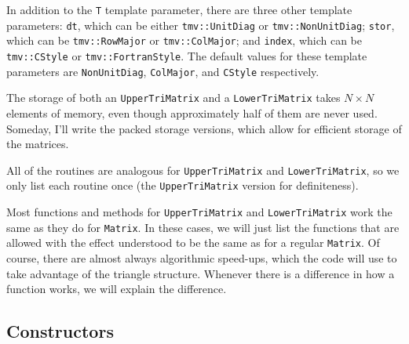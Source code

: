 \documentclass[twoside,letterpaper,11pt]{article}
\renewcommand{\tt}[1]{{\lstinline {#1}}}
\begin{document}
In addition to the \tt{T} template parameter, there are three other template 
parameters:
\tt{dt}, which can be either \tt{tmv::UnitDiag} or \tt{tmv::NonUnitDiag};
\tt{stor}, which can be \tt{tmv::RowMajor} or \tt{tmv::ColMajor};
and \tt{index}, which can be \tt{tmv::CStyle} or \tt{tmv::FortranStyle}.
The default values for these template parameters are 
\tt{NonUnitDiag}, \tt{ColMajor}, and \tt{CStyle} respectively.

The storage of both an \tt{UpperTriMatrix} and a \tt{LowerTriMatrix} takes
$N \times N$ elements of memory, even though approximately half of them 
are never used.  Someday, I'll write the packed storage versions, which allow for
efficient storage of the matrices.

All of the routines are analogous for \tt{UpperTriMatrix} and 
\tt{LowerTriMatrix}, so we only list each routine once 
(the \tt{UpperTriMatrix} version for
definiteness).  

Most functions and methods for \tt{UpperTriMatrix} and \tt{LowerTriMatrix}
work the same as they do for \tt{Matrix}.
In these cases, we will just list the functions that are allowed with the
effect understood to be the same as for a regular \tt{Matrix}.  Of course, there are 
almost always algorithmic speed-ups, which the code will use to take advantage of the 
triangle structure.
Whenever there is a difference in how a function works,
we will explain the difference.

\subsection{Constructors}
\label{TriMatrix_Constructors}
\end{document}

